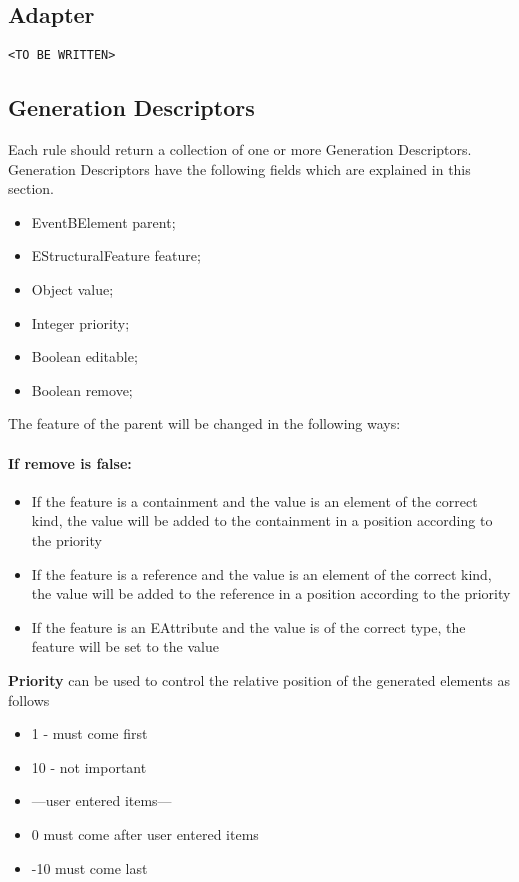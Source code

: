 \subsection{Adapter}
\label{sec:adapter}

\texttt{<TO BE WRITTEN>}

\subsection{Generation Descriptors}
\label{sec:descriptors}

Each rule should return a collection of one or more Generation Descriptors. Generation Descriptors have the following fields which are explained in this section.

\begin{itemize}
	\item EventBElement parent;
	\item EStructuralFeature feature;
	\item Object value;
	\item Integer priority;
	\item Boolean editable;
	\item Boolean remove;
\end{itemize}

The feature of the parent will be changed in the following ways:

\paragraph{If remove is false:}
\begin{itemize}
	\item  If the feature is a containment and the value is an element of the correct kind, the value will be added to the containment in a position according to the priority
	\item  If the feature is a reference and the value is an element of the correct kind, the value will be added to the reference in a position according to the priority
	\item  If the feature is an EAttribute and the value is of the correct type, the feature will be set to the value
\end{itemize}

\textbf{Priority} can be used to control the relative position of the generated elements as follows
\begin{itemize}
	\item 1 - must come first
	\item 10 - not important
	\item ---user entered items---
	\item 0 must come after user entered items
	\item -10 must come last
\end{itemize}


